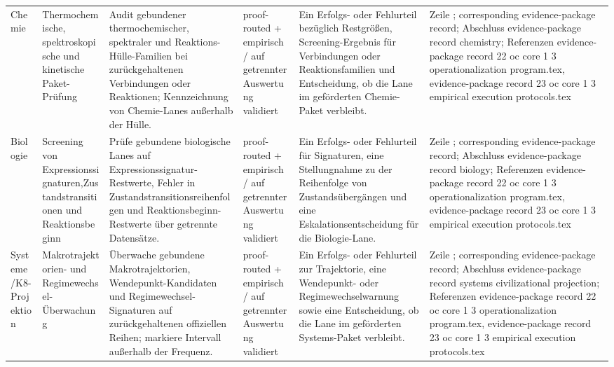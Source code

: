 \begin{longtable}{@{}L{0.11\textwidth}L{0.16\textwidth}L{0.19\textwidth}L{0.12\textwidth}L{0.18\textwidth}L{0.16\textwidth}@{}}
Chemie & Thermochemische, spektroskopische und kinetische Paket-Prüfung & Audit gebundener thermochemischer, spektraler und Reaktions-Hülle-Familien bei zurückgehaltenen Verbindungen oder Reaktionen; Kennzeichnung von Chemie-Lanes außerhalb der Hülle. & proof-routed + empirisch / auf getrennter Auswertung validiert & Ein Erfolgs- oder Fehlurteil bezüglich Restgrößen, Screening-Ergebnis für Verbindungen oder Reaktionsfamilien und Entscheidung, ob die Lane im geförderten Chemie-Paket verbleibt. & Zeile ; corresponding evidence-package record; \allowbreak Abschluss evidence-package record chemistry; \allowbreak Referenzen evidence-package record 22 oc core 1 3 operationalization program.tex, \allowbreak evidence-package record 23 oc core 1 3 empirical execution protocols.tex \\
Biologie & Screening von Expressionssignaturen,\allowbreak Zustandstransitionen und Reaktionsbeginn & Prüfe gebundene biologische Lanes auf Expressionssignatur-Restwerte, Fehler in Zustandstransitionsreihenfolgen und Reaktionsbeginn-Restwerte über getrennte Datensätze. & proof-routed + empirisch / auf getrennter Auswertung validiert & Ein Erfolgs- oder Fehlurteil für Signaturen, eine Stellungnahme zu der Reihenfolge von Zustandsübergängen und eine Eskalationsentscheidung für die Biologie-Lane. & Zeile ; corresponding evidence-package record; \allowbreak Abschluss evidence-package record biology; \allowbreak Referenzen evidence-package record 22 oc core 1 3 operationalization program.tex, \allowbreak evidence-package record 23 oc core 1 3 empirical execution protocols.tex \\
Systeme /\allowbreak K8-Projektion & Makrotrajektorien- und Regimewechsel-Überwachung & Überwache gebundene Makrotrajektorien, Wendepunkt-Kandidaten und Regimewechsel-Signaturen auf zurückgehaltenen offiziellen Reihen; markiere Intervall außerhalb der Frequenz. & proof-routed + empirisch / auf getrennter Auswertung validiert & Ein Erfolgs- oder Fehlurteil zur Trajektorie, eine Wendepunkt- oder Regimewechselwarnung sowie eine Entscheidung, ob die Lane im geförderten Systems-Paket verbleibt. & Zeile ; corresponding evidence-package record; \allowbreak Abschluss evidence-package record systems civilizational projection; \allowbreak Referenzen evidence-package record 22 oc core 1 3 operationalization program.tex, \allowbreak evidence-package record 23 oc core 1 3 empirical execution protocols.tex \\

\end{longtable}
